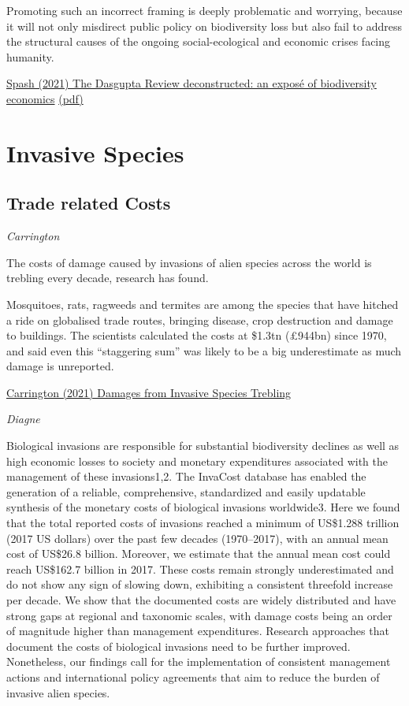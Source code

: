 \documentclass[
]{book}
\begin{document}
Promoting such
an incorrect framing is deeply problematic and worrying, because it will not only misdirect public
policy on biodiversity loss but also fail to address the structural causes of the ongoing
social-ecological and economic crises facing humanity.

\href{https://www.tandfonline.com/doi/full/10.1080/14747731.2021.1929007}{Spash (2021) The Dasgupta Review deconstructed: an exposé of biodiversity economics}
\href{pdf/Spash_2021_Dasgupta_Deconstructed.pdf}{(pdf)}

\hypertarget{invasive-species}{%
\section{Invasive Species}\label{invasive-species}}

\hypertarget{trade-related-costs}{%
\subsection{Trade related Costs}\label{trade-related-costs}}

\emph{Carrington}

The costs of damage caused by invasions of alien species across the world
is trebling every decade, research has found.

Mosquitoes, rats, ragweeds and termites are among the species that have hitched a ride on globalised trade routes, bringing disease, crop destruction and damage to buildings. The scientists calculated the costs at \$1.3tn (£944bn) since 1970, and said even this ``staggering sum'' was likely to be a big underestimate as much damage is unreported.

\href{https://www.inkl.com/news/damage-from-alien-species-invasions-trebling-every-decade?share=EQBnNnUMdyY}{Carrington (2021) Damages from Invasive Species Trebling}

\emph{Diagne}

Biological invasions are responsible for substantial biodiversity declines as well as high economic losses to society and monetary expenditures associated with the management of these invasions1,2. The InvaCost database has enabled the generation of a reliable, comprehensive, standardized and easily updatable synthesis of the monetary costs of biological invasions worldwide3. Here we found that the total reported costs of invasions reached a minimum of US\$1.288 trillion (2017 US dollars) over the past few decades (1970--2017), with an annual mean cost of US\$26.8 billion. Moreover, we estimate that the annual mean cost could reach US\$162.7 billion in 2017. These costs remain strongly underestimated and do not show any sign of slowing down, exhibiting a consistent threefold increase per decade. We show that the documented costs are widely distributed and have strong gaps at regional and taxonomic scales, with damage costs being an order of magnitude higher than management expenditures. Research approaches that document the costs of biological invasions need to be further improved. Nonetheless, our findings call for the implementation of consistent management actions and international policy agreements that aim to reduce the burden of invasive alien species.
\end{document}
